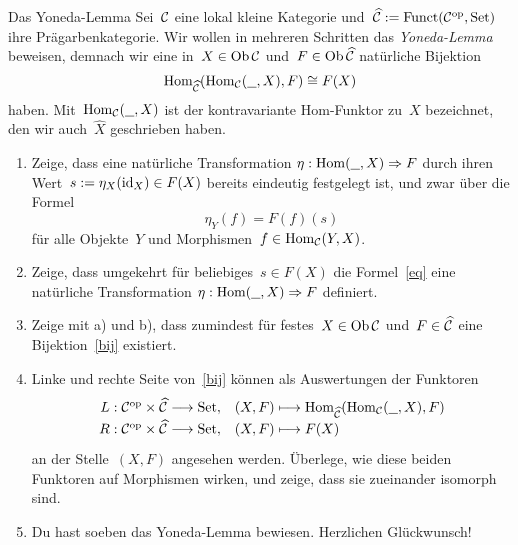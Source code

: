 \documentclass{pizzablatt}
\begin{document}

\begin{aufgabe}{Das Yoneda-Lemma}
Sei~$\mathcal{C}$ eine lokal kleine Kategorie und~$\widehat {\mathcal{C}} := \mathrm{Funct}(\mathcal{C}^{\mathrm{op}},\mathrm{Set})$
ihre Prägarbenkategorie. Wir wollen in mehreren Schritten das \emph{Yoneda-Lemma}
beweisen, demnach wir eine in~$X \in \operatorname{Ob} \mathcal{C}$ und~$F \in \operatorname{Ob} \widehat {\mathcal{C}}$
natürliche Bijektion
\begin{equation}\label{bij}\mathrm{Hom}_{\widehat{\mathcal{C}}}(\mathrm{Hom}_{\mathcal{C}}(\underline{\ \ }, X), F) \cong F(X)
\end{equation}
haben. Mit~$\mathrm{Hom}_{\mathcal{C}}(\underline{\ \ },X)$ ist der kontravariante Hom-Funktor zu~$X$
bezeichnet, den wir auch~$\widehat X$ geschrieben haben.
\begin{enumerate}
\item Zeige, dass eine natürliche Transformation $\eta : \mathrm{Hom}(\underline{\ \ }, X)
\Rightarrow F$ durch ihren Wert~$s := \eta_X(\mathrm{id}_X) \in F(X)$ bereits eindeutig
festgelegt ist, und zwar über die Formel
\begin{equation}\label{eq} \eta_Y(f) = F(f)(s) \end{equation}
für alle Objekte~$Y$ und Morphismen~$f \in \mathrm{Hom}_{\mathcal{C}}(Y,X)$.
\item Zeige, dass umgekehrt für beliebiges~$s \in F(X)$ die Formel~\eqref{eq} eine
natürliche Transformation $\eta : \mathrm{Hom}(\underline{\ \ }, X) \Rightarrow F$ definiert.
\item Zeige mit a) und b), dass zumindest für festes~$X \in \operatorname{Ob}\mathcal{C}$ und~$F \in
\widehat{\mathcal{C}}$ eine Bijektion~\eqref{bij} existiert.
\item Linke und rechte Seite von~\eqref{bij} können als Auswertungen der
Funktoren
\[ \renewcommand{\arraystretch}{1.3}\begin{array}{@{}rl@{}}
  L : \C^\op \times \widehat\C \longrightarrow \Set, &
  (X,F) \longmapsto \Hom_{\widehat\C}(\Hom_\C(\freist,X), F)
  \\
  R : \C^\op \times \widehat\C \longrightarrow \Set, &
  (X,F) \longmapsto F(X)
\end{array} \]
an der Stelle~$(X,F)$ angesehen werden. Überlege, wie diese beiden Funktoren auf
Morphismen wirken, und zeige, dass sie zueinander isomorph sind.
\item Du hast soeben das Yoneda-Lemma bewiesen. Herzlichen Glückwunsch!
\end{enumerate}
\end{aufgabe}
\end{document}
